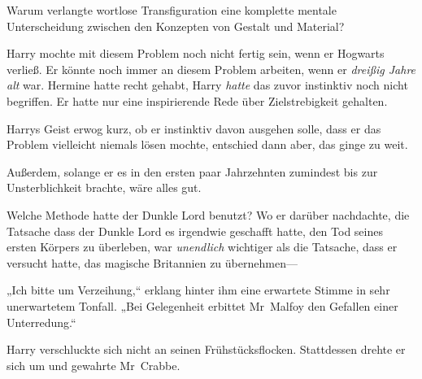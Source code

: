 Warum verlangte wortlose Transfiguration eine komplette mentale Unterscheidung zwischen den Konzepten von Gestalt und Material?

Harry mochte mit diesem Problem noch nicht fertig sein, wenn er Hogwarts verließ. Er könnte noch immer an diesem Problem arbeiten, wenn er \emph{dreißig Jahre alt} war. Hermine hatte recht gehabt, Harry \emph{hatte} das zuvor instinktiv noch nicht begriffen. Er hatte nur eine inspirierende Rede über Zielstrebigkeit gehalten.

Harrys Geist erwog kurz, ob er instinktiv davon ausgehen solle, dass er das Problem vielleicht niemals lösen mochte, entschied dann aber, das ginge zu weit.

Außerdem, solange er es in den ersten paar Jahrzehnten zumindest bis zur Unsterblichkeit brachte, wäre alles gut.

Welche Methode hatte der Dunkle Lord benutzt? Wo er darüber nachdachte, die Tatsache dass der Dunkle Lord es irgendwie geschafft hatte, den Tod seines ersten Körpers zu überleben, war \emph{unendlich} wichtiger als die Tatsache, dass er versucht hatte, das magische Britannien zu übernehmen—

„Ich bitte um Verzeihung,“ erklang hinter ihm eine erwartete Stimme in sehr unerwartetem Tonfall. „Bei Gelegenheit erbittet Mr~Malfoy den Gefallen einer Unterredung.“

Harry verschluckte sich nicht an seinen Frühstücksflocken. Stattdessen drehte er sich um und gewahrte Mr~Crabbe.


